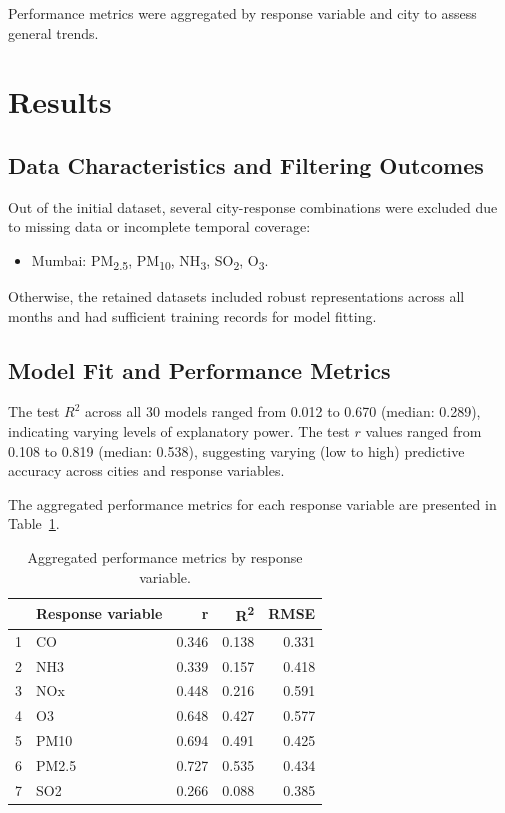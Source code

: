 \documentclass[twoside,11pt]{article}
\begin{document}
Performance metrics were aggregated by response variable and city to assess general trends.

\section{Results}

\subsection{Data Characteristics and Filtering Outcomes}

Out of the initial dataset, several city-response combinations were excluded due to missing data or incomplete temporal coverage:

\begin{itemize}
  \item Mumbai: PM\textsubscript{2.5}, PM\textsubscript{10}, NH\textsubscript{3}, SO\textsubscript{2}, O\textsubscript{3}.
\end{itemize}

Otherwise, the retained datasets included robust representations across all months and had sufficient training records for model fitting.

\subsection{Model Fit and Performance Metrics}

The test $R^2$ across all 30 models ranged from 0.012 to 0.670 (median: 0.289), indicating varying levels of explanatory power. The test $r$ values ranged from 0.108 to 0.819 (median: 0.538), suggesting varying (low to high) predictive accuracy across cities and response variables.

The aggregated performance metrics for each response variable are presented in Table~\ref{tab:performance_metrics_by_variable}.

\begin{table}[ht]
\centering
\begin{tabular}{rlrrr}
  \hline
  & Response variable & r & R\textsuperscript{2} & RMSE \\
  \hline
1 & CO & 0.346 & 0.138 & 0.331 \\ 
  2 & NH3 & 0.339 & 0.157 & 0.418 \\ 
  3 & NOx & 0.448 & 0.216 & 0.591 \\ 
  4 & O3 & 0.648 & 0.427 & 0.577 \\ 
  5 & PM10 & 0.694 & 0.491 & 0.425 \\ 
  6 & PM2.5 & 0.727 & 0.535 & 0.434 \\ 
  7 & SO2 & 0.266 & 0.088 & 0.385 \\ 
    \hline
\end{tabular}
\caption{Aggregated performance metrics by response variable.}
\label{tab:performance_metrics_by_variable}
\end{table}
\end{document}
